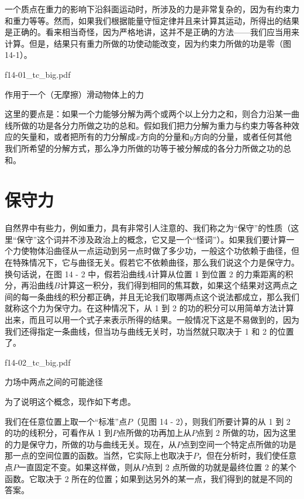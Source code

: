 \documentclass[12pt,oneside]{book}
\begin{document}
一个质点在重力的影响下沿斜面运动时，所涉及的力是非常复杂的，因为有约束力和重力等等。然而，如果我们根据能量守恒定律并且来计算其运动，所得出的结果是正确的。看来相当奇怪，因为严格地讲，这并不是正确的方法——我们应当用来计算。但是，结果只有重力所做的功使动能改变，因为约束力所做的功是零（图14-1）。

\begin{fig}{f14-01_tc_big.pdf}
\caption{作用于一个（无摩擦）滑动物体上的力}
\label{fig:14-1}
\end{fig}

这里的要点是：如果一个力能够分解为两个或两个以上分力之和，则合力沿某一曲线所做的功是各分力所做之功的总和。假如我们把力分解为重力与约束力等各种效应的矢量和，或者把所有的力分解成$ x $方向的分量和$ y $方向的分量，或者任何其他我们所希望的分解方式，那么净力所做的功等于被分解成的各分力所做之功的总和。


\section{保守力}
自然界中有些力，例如重力，具有非常引人注意的、我们称之为“保守”的性质（这里“保守”这个词并不涉及政治上的概念，它又是一个“怪词”）。如果我们要计算一个力使物体沿曲径从一点运动到另一点时做了多少功，一般这个功依赖于曲径，但在特殊情况下，它与曲径无关。假若它不依赖曲径，那么我们说这个力是保守力。换句话说，在图 14 - 2 中，假若沿曲线$A$计算从位置 1 到位置 2 的力乘距离的积分，再沿曲线$B$计算这一积分，我们得到相同的焦耳数，如果这个结果对这两点之间的每一条曲线的积分都正确，并且无论我们取哪两点这个说法都成立，那么我们就称这个力为保守力。在这种情况下，从 1 到 2 的功的积分可以用简单方法计算出来，而且可以用一个式子来表示所得的结果。一般情况下这是不易做到的，因为我们还得指定一条曲线，但当功与曲线无关时，功当然就只取决于 1 和 2 的位置了。

\begin{fig}{f14-02_tc_big.pdf}
\caption{力场中两点之间的可能途径}
\label{fig:14-2}
\end{fig}


为了说明这个概念，现作如下考虑。


我们在任意位置上取一个“标准”点$P$（见图 14 - 2），则我们所要计算的从 1 到 2 的功的线积分，可看作从 1 到$P$点所做的功再加上从$P$点到 2 所做的功，因为这里的力是保守力，所做的功与曲线无关。现在，从$P$点到空间一个特定点所做的功是那一点的空间位置的函数。当然，它实际上也取决于$P$，但在分析时，我们使任意点$P$一直固定不变。如果这样做，则从$P$点到 2 点所做的功就是最终位置 2 的某个函数。它取决于 2 所在的位置；如果到达另外的某一点，我们得到的就是不同的答案。
\end{document}
